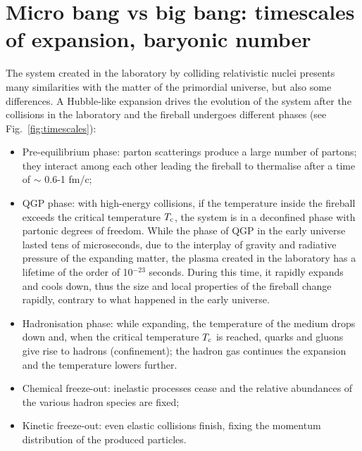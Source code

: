 \section{Micro bang vs big bang: timescales of expansion, baryonic number}
\label{sec:Timescales}
The system created in the laboratory by colliding
relativistic nuclei presents many similarities with 
the matter of the primordial universe, but also some differences. 
A Hubble-like expansion drives the 
evolution of the system after the collisions in the laboratory and the fireball undergoes different phases (see Fig.~\ref{fig:timescales}): 
\begin{itemize}
\item Pre-equilibrium phase: parton scatterings produce a large number of partons; 
they interact among each other leading the fireball to thermalise after a 
time of $\sim$ 0.6-1 fm/c;
\item QGP phase: with high-energy collisions, if the temperature inside the fireball 
exceeds the critical temperature $T_{\rm c}$, the system is in a deconfined 
phase with partonic degrees of freedom. While the phase of QGP in the early universe lasted
tens of microseconds, due to the interplay of gravity and
radiative pressure of the expanding matter, the plasma created in the laboratory 
has a lifetime of the order of 10$^{-23}$ seconds. During this time, it rapidly expands
and cools down, thus the size and local properties of
the fireball change rapidly, contrary to what happened in the 
early universe.

\item Hadronisation phase: while expanding, the temperature 
of the medium drops down and, when the critical temperature $T_{\rm c}$
is reached, quarks and gluons give rise to hadrons (confinement); the hadron
gas continues the expansion and the temperature lowers further.

\item Chemical freeze-out: inelastic processes cease and the relative abundances of the various hadron species are fixed;
\item Kinetic freeze-out: even elastic collisions finish, fixing the momentum distribution of the produced particles. 
\end{itemize} 


